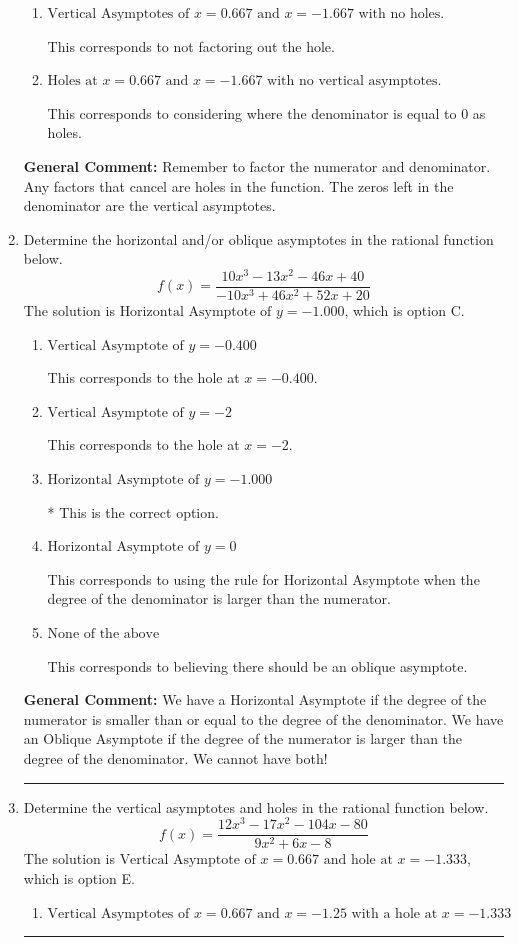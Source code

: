 \documentclass{extbook}[14pt]
\newcommand{\litem}[1]{\item #1

\rule{\textwidth}{0.4pt}}
\begin{document}
\begin{enumerate}
{\begin{enumerate}[label=\Alph*.]
This corresponds to mixing vertical and horizontal asymptotes.
\item \( \text{Vertical Asymptotes of } x = 0.667 \text{ and } x = -1.667 \text{ with no holes.} \)

This corresponds to not factoring out the hole.
\item \( \text{Holes at } x = 0.667 \text{ and } x = -1.667 \text{ with no vertical asymptotes.} \)

This corresponds to considering where the denominator is equal to 0 as holes.
\end{enumerate}

\textbf{General Comment:} Remember to factor the numerator and denominator. Any factors that cancel are holes in the function. The zeros left in the denominator are the vertical asymptotes.
}
\litem{
Determine the horizontal and/or oblique asymptotes in the rational function below.
\[ f(x) = \frac{10x^{3} -13 x^{2} -46 x + 40}{-10x^{3} +46 x^{2} +52 x + 20} \]The solution is \( \text{Horizontal Asymptote of } y = -1.000  \), which is option C.\begin{enumerate}[label=\Alph*.]
\item \( \text{Vertical Asymptote of } y = -0.400  \)

This corresponds to the hole at $x = -0.400$.
\item \( \text{Vertical Asymptote of } y = -2  \)

This corresponds to the hole at $x = -2$.
\item \( \text{Horizontal Asymptote of } y = -1.000  \)

* This is the correct option.
\item \( \text{Horizontal Asymptote of } y = 0  \)

This corresponds to using the rule for Horizontal Asymptote when the degree of the denominator is larger than the numerator.
\item \( \text{None of the above} \)

This corresponds to believing there should be an oblique asymptote.
\end{enumerate}

\textbf{General Comment:} We have a Horizontal Asymptote if the degree of the numerator is smaller than or equal to the degree of the denominator. We have an Oblique Asymptote if the degree of the numerator is larger than the degree of the denominator. We cannot have both!
}
\litem{
Determine the vertical asymptotes and holes in the rational function below.
\[ f(x) = \frac{12x^{3} -17 x^{2} -104 x -80}{9x^{2} +6 x -8} \]The solution is \( \text{Vertical Asymptote of } x = 0.667 \text{ and hole at } x = -1.333 \), which is option E.\begin{enumerate}[label=\Alph*.]
\item \( \text{Vertical Asymptotes of } x = 0.667 \text{ and } x = -1.25 \text{ with a hole at } x = -1.333 \)


\end{enumerate}}
\end{enumerate}
\end{document}
